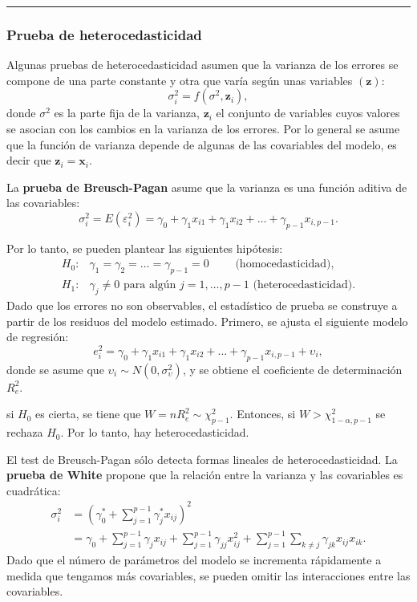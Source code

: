 \documentclass[
]{article}
\begin{document}
\rule{\textwidth}{0.4pt}

\hypertarget{prueba-de-heterocedasticidad}{%
\subsubsection{Prueba de heterocedasticidad}\label{prueba-de-heterocedasticidad}}

Algunas pruebas de heterocedasticidad asumen que la varianza de los errores se compone de una parte constante y otra que varía según unas variables \((\boldsymbol z)\):
\[
\sigma^{2}_{i} = f(\sigma^{2},\boldsymbol z_{i}),
\]
donde \(\sigma^{2}\) es la parte fija de la varianza, \(\boldsymbol z_{i}\) el conjunto de variables cuyos valores se asocian con los cambios en la varianza de los errores. Por lo general se asume que la función de varianza depende de algunas de las covariables del modelo, es decir que \(\boldsymbol z_{i}=\boldsymbol x_{i}\).

La \textbf{prueba de Breusch-Pagan} asume que la varianza es una función aditiva de las covariables:
\[
\sigma^{2}_{i} = E(\varepsilon_{i}^{2}) = \gamma_{0} + \gamma_{1}x_{i1}+ \gamma_{1}x_{i2} + \ldots  + \gamma_{p-1}x_{i,p-1}.
\]

Por lo tanto, se pueden plantear las siguientes hipótesis:
\begin{equation}
\begin{split}
H_{0}:& \gamma_{1} = \gamma_{2} = \ldots = \gamma_{p-1} = 0 \qquad \mbox{ (homocedasticidad)}, \\
H_{1}:& \gamma_{j}\neq 0 \mbox{ para algún }j=1,\ldots,p-1 \mbox{ (heterocedasticidad)}.
\end{split}
\nonumber
\end{equation}
Dado que los errores no son observables, el estadístico de prueba se construye a partir de los residuos del modelo estimado. Primero, se ajusta el siguiente modelo de regresión:
\[
e_{i}^{2} = \gamma_{0} + \gamma_{1}x_{i1}+ \gamma_{1}x_{i2} + \ldots  + \gamma_{p-1}x_{i,p-1} + \upsilon_{i},
\]
donde se asume que \(\upsilon_{i}\sim N(0,\sigma^{2}_{\upsilon})\), y se obtiene el coeficiente de determinación \(R^{2}_{e}\).

si \(H_{0}\) es cierta, se tiene que \(W = n R^{2}_{e} \sim \chi^{2}_{p-1}\). Entonces, si \(W > \chi^{2}_{1-\alpha,p-1}\) se rechaza \(H_{0}\). Por lo tanto, hay heterocedasticidad.

El test de Breusch-Pagan sólo detecta formas lineales de heterocedasticidad. La \textbf{prueba de White} propone que la relación entre la varianza y las covariables es cuadrática:
\begin{equation}
\begin{split}
\sigma^{2}_{i} &= \left(\gamma_{0}^{*} + \sum_{j=1}^{p-1}\gamma_{j}^{*}x_{ij}\right)^{2} \\
&= \gamma_{0} + \sum_{j=1}^{p-1}\gamma_{j}x_{ij} + \sum_{j=1}^{p-1}\gamma_{jj}x_{ij}^{2} + \sum_{j=1}^{p-1}\sum_{k \neq j}\gamma_{jk}x_{ij}x_{ik}.
\end{split}
\nonumber
\end{equation}
Dado que el número de parámetros del modelo se incrementa rápidamente a medida que tengamos más covariables, se pueden omitir las interacciones entre las covariables.
\end{document}
